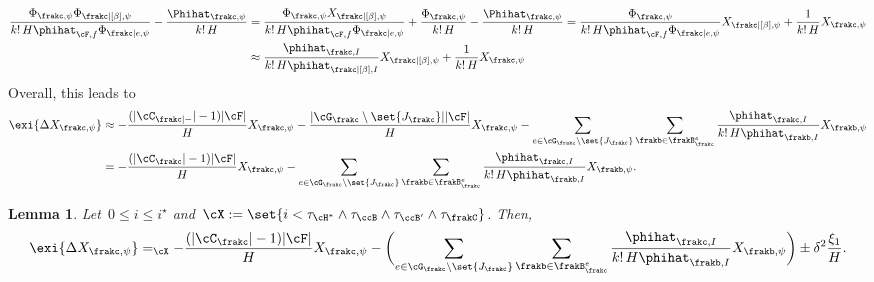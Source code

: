 \documentclass[11pt]{amsart}
\DeclarePairedDelimiter{\paren}{\lparen}{\rparen}
\DeclarePairedDelimiter{\abs}{\lvert}{\rvert}
\newcommand{\Xeq}{=_{\cX}}
\newcommand{\om}{\mathord{-}}
\newtheorem{lemma}[algocf]{Lemma}
\theoremstyle{definition}
\numberwithin{equation}{section}
\begin{document}
	\begin{equation*}
		\begin{aligned}
			\frac{\Phi_{\frakc,\psi}\Phi_{\frakc|[\beta],\psi}}{k!\,H\phihat_{\cF,f}\Phi_{\frakc|e,\psi}}-\frac{\Phihat_{\frakc,\psi}}{k!\,H}
			&=\frac{\Phi_{\frakc,\psi}X_{\frakc|[\beta],\psi}}{k!\,H\phihat_{\cF,f}\Phi_{\frakc|e,\psi}}+\frac{\Phi_{\frakc,\psi}}{k!\,H}-\frac{\Phihat_{\frakc,\psi}}{k!\,H}
			=\frac{\Phi_{\frakc,\psi}}{k!\,H\phihat_{\cF,f}\Phi_{\frakc|e,\psi}}X_{\frakc|[\beta],\psi}+\frac{1}{k!\,H}X_{\frakc,\psi}\\
			&\approx \frac{\phihat_{\frakc,I}}{k!\,H\phihat_{\frakc|[\beta],I}}X_{\frakc|[\beta],\psi}+\frac{1}{k!\,H}X_{\frakc,\psi}
		\end{aligned}
	\end{equation*}
	Overall, this  leads to
	\begin{equation*}
		\begin{aligned}
			\exi{\Delta X_{\frakc,\psi}}
			&\approx-\frac{(\abs{\cC_{\frakc|\om}}-1)\abs{\cF}}{H}X_{\frakc,\psi}-\frac{\abs{\cG_\frakc\setminus\set{J_\frakc}}\abs{\cF}}{H}X_{\frakc,\psi}-\sum_{e\in\cG_\frakc\setminus\set{J_\frakc}}\sum_{\frakb\in\frakB_\frakc^e} \frac{\phihat_{\frakc,I}}{k!\,H\phihat_{\frakb,I}}X_{\frakb,\psi}\\
			&=-\frac{(\abs{\cC_\frakc}-1)\abs{\cF}}{H}X_{\frakc,\psi}-\sum_{e\in\cG_\frakc\setminus\set{J_\frakc}}\sum_{\frakb\in\frakB_\frakc^e} \frac{\phihat_{\frakc,I}}{k!\,H\phihat_{\frakb,I}}X_{\frakb,\psi}.
		\end{aligned}
	\end{equation*}

	\begin{lemma}\label{lemma: ladder deviation trend}
		Let~$0\leq i\leq i^\star$ and~$\cX:=\set{i<\tau_{\cH^*}\wedge \tau_\ccB\wedge \tau_{\ccB'}\wedge \tau_\frakC }$.
		Then,
		\begin{equation*}
			\exi{\Delta X_{\frakc,\psi}}\Xeq -\frac{(\abs{\cC_\frakc}-1)\abs{\cF}}{H}X_{\frakc,\psi}-\paren[\bigg]{\sum_{e\in\cG_\frakc\setminus\set{J_\frakc}}\sum_{\frakb\in \frakB_\frakc^e}\frac{\phihat_{\frakc,I}}{k!\,H\phihat_{\frakb,I}}X_{\frakb,\psi}}\pm\delta^2\frac{\xi_1}{H}.
		\end{equation*}
	\end{lemma}
	
\end{document}
